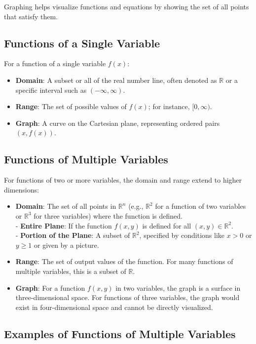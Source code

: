 Graphing helps visualize functions and equations by showing the set of all points that satisfy them.

\subsection{Functions of a Single Variable}

For a function of a single variable \( f(x) \):
\begin{itemize}
    \item \textbf{Domain}: A subset or all of the real number line, often denoted as \(\mathbb{R}\) or a specific interval such as \((- \infty, \infty)\).
    \item \textbf{Range}: The set of possible values of \( f(x) \); for instance, \([0, \infty)\).
    \item \textbf{Graph}: A curve on the Cartesian plane, representing ordered pairs \((x, f(x))\).
\end{itemize}

\subsection{Functions of Multiple Variables}

For functions of two or more variables, the domain and range extend to higher dimensions:
\begin{itemize}
    \item \textbf{Domain}: The set of all points in \(\mathbb{R}^n\) (e.g., \(\mathbb{R}^2\) for a function of two variables or \(\mathbb{R}^3\) for three variables) where the function is defined.\\
        - \textbf{Entire Plane}: If the function \( f(x, y) \) is defined for all \((x, y) \in \mathbb{R}^2\).\\
        - \textbf{Portion of the Plane}: A subset of \(\mathbb{R}^2\), specified by conditions like \(x > 0\) or \(y \geq 1\) or given by a picture.
    \item \textbf{Range}: The set of output values of the function. For many functions of multiple variables, this is a subset of \(\mathbb{R}\).
    \item \textbf{Graph}: For a function \( f(x, y) \) in two variables, the graph is a surface in three-dimensional space. For functions of three variables, the graph would exist in four-dimensional space and cannot be directly visualized.
\end{itemize}

\subsection*{Examples of Functions of Multiple Variables}

